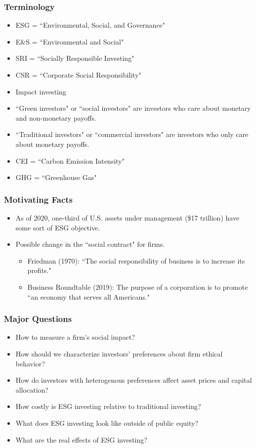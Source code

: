 \documentclass[handout]{beamer}
\begin{document}
\begin{frame}
\frametitle{Terminology}
\begin{itemize}
\item ESG = ``Environmental, Social, and Governance"
\item E\&S = ``Environmental and Social"
\item SRI = ``Socially Responsible Investing"
\item CSR = ``Corporate Social Responsibility"
\item Impact investing

\bigskip

\item ``Green investors" or ``social investors" are investors who care about monetary and non-monetary payoffs.
\item ``Traditional investors" or ``commercial investors" are investors who only care about monetary payoffs.

\bigskip

\item CEI = ``Carbon Emission Intensity"
\item GHG = ``Greenhouse Gas"
\end{itemize}
\end{frame}


\begin{frame}
\frametitle{Motivating Facts}
\begin{itemize}[<+->]
\item As of 2020, one-third of U.S. assets under management (\$17 trillion) have some sort of ESG objective.
\bigskip
\item Possible change in the ``social contract" for firms.
\begin{itemize}
\item Friedman (1970): ``The social responsibility of business is to increase its profits."
\item Business Roundtable (2019): The purpose of a corporation is to promote ``an economy that serves all Americans."
\end{itemize}
\end{itemize}
\end{frame}



\begin{frame}
\frametitle{Major Questions}
\begin{itemize}[<+->]
\item How to measure a firm's social impact?
\bigskip
\item How should we characterize investors' preferences about firm ethical behavior?
\bigskip
\item How do investors with heterogenous preferences affect asset prices and capital allocation?
\bigskip
\item How costly is ESG investing relative to traditional investing?
\bigskip
\item What does ESG investing look like outside of public equity?
\bigskip
\item What are the real effects of ESG investing?
\end{itemize}
\end{frame}
\end{document}
